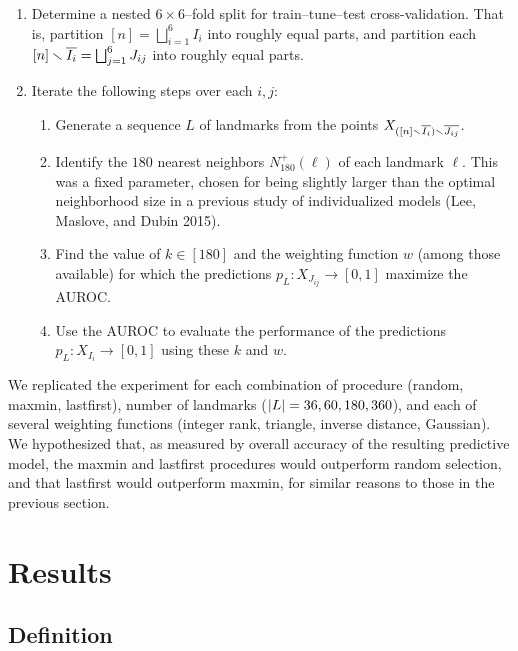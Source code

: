 \documentclass{article}
\providecommand{\tightlist}{%
  \setlength{\itemsep}{0pt}\setlength{\parskip}{0pt}}
\begin{document}
\begin{enumerate}
\def\labelenumi{\arabic{enumi}.}
\tightlist
\item
  Determine a nested \(6 \times 6\)--fold split for train--tune--test
  cross-validation. That is, partition
  \([n] = \bigsqcup_{i=1}^{6}{I_i}\) into roughly equal parts, and
  partition each \([n] \smallsetminus \overline{I_i} = \bigsqcup_{j=1}^{6}{J_{ij}}\) into
  roughly equal parts.
\item
  Iterate the following steps over each \(i,j\):

  \begin{enumerate}
  \def\labelenumii{\alph{enumii})}
  \tightlist
  \item
    Generate a sequence \(L\) of landmarks from the points
    \(X_{([n] \smallsetminus \overline{I_i}) \smallsetminus \overline{J_{ij}}}\).
  \item
    Identify the \(180\) nearest neighbors \(N^+_{180}(\ell)\) of each
    landmark \(\ell\). This was a fixed parameter, chosen for being
    slightly larger than the optimal neighborhood size in a previous
    study of individualized models (Lee, Maslove, and Dubin 2015).
  \item
    Find the value of \(k \in [180]\) and the weighting function \(w\)
    (among those available) for which the predictions
    \(p_L : X_{J_{ij}} \to [0,1]\) maximize the AUROC.
  \item
    Use the AUROC to evaluate the performance of the predictions
    \(p_L : X_{I_i} \to [0,1]\) using these \(k\) and \(w\).
  \end{enumerate}
\end{enumerate}

We replicated the experiment for each combination of procedure (random,
maxmin, lastfirst), number of landmarks (\(\lvert L\rvert=36,60,180,360\)), and
each of several weighting functions (integer rank, triangle, inverse
distance, Gaussian). We hypothesized that, as measured by overall
accuracy of the resulting predictive model, the maxmin and lastfirst
procedures would outperform random selection, and that lastfirst would
outperform maxmin, for similar reasons to those in the previous section.

\hypertarget{results}{%
\section{Results}\label{results}}

\label{sec:results}

\hypertarget{definition}{%
\subsection{Definition}\label{definition}}
\end{document}
